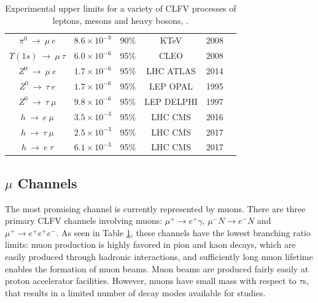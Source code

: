 \begin{center}
\begin{table}[!h]
\begin{tabular}{c c c c c c}
$\pi^0 \ \rightarrow \ \mu \ e$ & $8.6 \times 10^{-9}$ & 90\% & KTeV & 2008 & \cite{KTeV:2007cvy}\\
$\Upsilon (1s) \ \rightarrow \ \mu \ \tau $ & $6.0 \times 10^{-6}$ & 95\% & CLEO & 2008 & \cite{Love_2008}\\
\hline
$Z^0 \ \rightarrow \ \mu \ e$ & $1.7 \times 10^{-6}$ & 95\% &  LHC ATLAS & 2014 & \cite{Aad_2014} \\
$Z^0 \ \rightarrow \ \tau \ e$ & $1.7 \times 10^{-6}$ & 95\% &  LEP OPAL & 1995 & \cite{akers}\\
$Z^0 \ \rightarrow \ \tau \ \mu$ & $9.8 \times 10^{-6}$ & 95\% &  LEP DELPHI & 1997 & \cite{abreu}\\
$h \ \rightarrow \ e \ \mu$ & $3.5 \times 10^{-3}$ & 95\% & LHC CMS & 2016 & \cite{PhysRevD.104.032013}\\
$h \ \rightarrow \ \tau  \ \mu$ & $2.5 \times 10^{-3}$ & 95\% & LHC CMS & 2017 & \cite{cms17}\\
$h \ \rightarrow \ e \ \tau$ & $6.1 \times 10^{-3}$ & 95\% & LHC CMS & 2017 & \cite{cms17}\\
\hline
\end{tabular}
\caption{Experimental upper limits for a variety of CLFV processes of leptons, mesons and heavy bosons, \cite{clfv_signorelli}.}
\label{tab:upperlimits}
\end{table}
\end{center}
\vspace{-15mm}
\subsection{$\mu$ Channels}
The most promising channel is currently represented by muons. 
There are three primary CLFV channels involving muons: 
$\mu^+ \rightarrow e^+ \gamma$, $\mu^- N \rightarrow e^- N$ and $\mu^+ \rightarrow e^+ e^+ e^-$. 
As seen in Table \ref{tab:upperlimits}, 
these channels have the lowest branching ratio limits: 
muon production is highly favored in pion and kaon decays, 
which are easily produced through hadronic interactions, and  
sufficiently long muon lifetime enables the 
formation of muon beams. Muon beams are produced fairly easily at proton accelerator facilities.
However, muons have small mass with respect to $\tau$s, that results
in a limited number of decay modes available for studies. 

